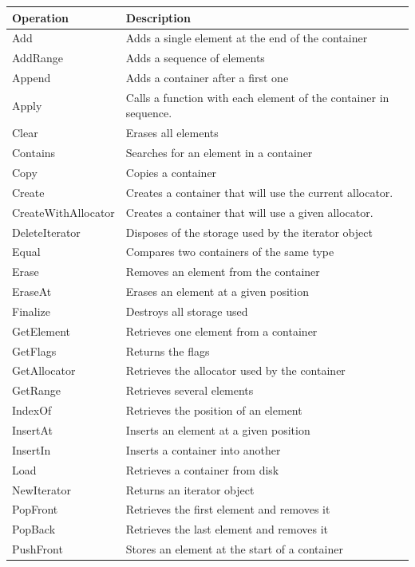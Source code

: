 \documentclass[12pt,a4paper,openany]{memoir} %
\begin{document}
{\footnotesize
\begin{longtable}{|p{3.5cm}|p{10.5cm}|}
\hline
\textbf{Operation}&\textbf{Description}\\\hline 
Add&Adds a single element at the end of the container\\\hline
AddRange&Adds a sequence of elements\\\hline
Append&Adds a container after a first one \\\hline
Apply&Calls a function with each element of the container in  sequence.\\\hline
Clear&Erases all elements \\\hline
Contains&Searches for an element in a container\\\hline
Copy&Copies a container \\\hline
Create&Creates a container that will use the current allocator.\\\hline
CreateWithAllocator&Creates a container that will use a given allocator.\\\hline
DeleteIterator&Disposes of the storage used by the iterator object \\\hline
Equal&Compares two containers of the same type \\\hline
Erase&Removes an element from the container\\\hline
EraseAt&Erases an element at a given position \\\hline
Finalize&Destroys all storage used \\\hline 
GetElement&Retrieves one element from a container \\\hline
GetFlags&Returns the flags\\\hline
GetAllocator&Retrieves the allocator used by the container\\\hline
GetRange&Retrieves several elements\\\hline
IndexOf&Retrieves the position of an element \\\hline
InsertAt&Inserts an element at a given position \\\hline
InsertIn&Inserts a container into another \\\hline
Load&Retrieves a container from disk \\\hline
NewIterator&Returns an iterator object \\\hline
PopFront & Retrieves the first element and removes it\\\hline
PopBack& Retrieves the last element and removes it\\\hline
PushFront & Stores an element at the start of a container\\\hline

\end{longtable}}
\end{document}
